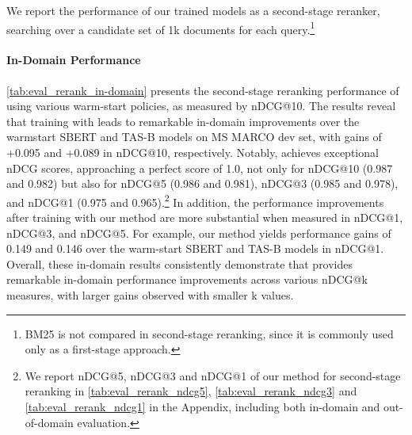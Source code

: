 \documentclass{article}
\begin{document}
We report the performance of our trained models as a second-stage reranker, searching over a candidate set of 1k documents for each query.\footnote{BM25 is not compared in second-stage reranking, since it is commonly used only as a first-stage approach.} 

\paragraph{In-Domain Performance} 
\autoref{tab:eval_rerank_in-domain} presents the second-stage reranking performance of \alg{} using various warm-start policies, as measured by nDCG@10.  The results reveal that training with \alg{} leads to remarkable in-domain improvements over the warmstart SBERT and TAS-B models on MS MARCO dev set, with gains of +0.095 and +0.089 in nDCG@10, respectively. Notably, \alg{} achieves exceptional nDCG scores, approaching a perfect score of 1.0, not only for nDCG@10 (0.987 and 0.982) but also for nDCG@5 (0.986 and 0.981), nDCG@3 (0.985 and 0.978), and nDCG@1 (0.975 and 0.965).\footnote{We report nDCG@5, nDCG@3 and nDCG@1 of our method for second-stage reranking in \autoref{tab:eval_rerank_ndcg5}, \autoref{tab:eval_rerank_ndcg3} and \autoref{tab:eval_rerank_ndcg1} in the Appendix, including both in-domain and out-of-domain evaluation.}
In addition, the performance improvements after training with our method are more substantial when measured in nDCG@1, nDCG@3, and nDCG@5. For example, our method yields performance gains of 0.149 and 0.146 over the warm-start SBERT and TAS-B models in nDCG@1. Overall, these in-domain results consistently demonstrate that \alg{} provides remarkable in-domain performance improvements across various nDCG@k measures, with larger gains observed with smaller k values. 
\end{document}

